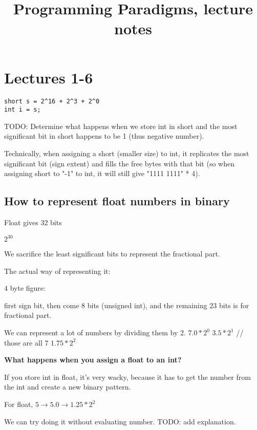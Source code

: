 

\title{Programming Paradigms, lecture notes}

\maketitle

\tableofcontents
\newpage

\section{Lectures 1-6}

\begin{lstlisting}
short s = 2^16 + 2^3 + 2^0
int i = s;
\end{lstlisting}

TODO:
    Determine what happens when we store int in short and the most significant bit
    in short happens to be 1 (thus negative number).

Technically, when assigning a short (smaller size) to int, it replicates the
most significant bit (sign extent) and fills the free bytes with that bit (so
when assigning short to "-1" to int, it will still give "1111 1111" * 4).

\subsection{How to represent float numbers in binary}

Float gives 32 bits

$2^30$

We sacrifice the least significant bits to represent the fractional part.

The actual way of representing it:

4 byte figure:

first sign bit, then come 8 bits (unsigned int), and the remaining 23 bits is
for fractional part.

We can represent a lot of numbers by dividing them by 2.
$7.0 * 2^0$
$3.5 * 2^1$     // those are all 7
$1.75 * 2^2$


\textbf{What happens when you assign a float to an int?}

If you store int in float, it's very wacky, because it has to get the number
from the int and create a new binary pattern.

For float, $5 \rightarrow 5.0 \rightarrow 1.25 * 2^2$

We can try doing it without evaluating number. TODO: add explanation.


